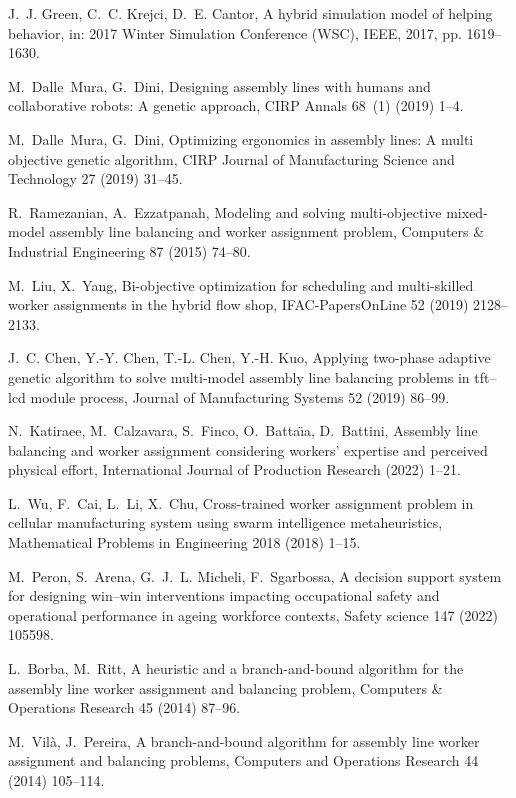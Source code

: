 \documentclass[review,12pt, 3p, times]{elsarticle}
\begin{document}
\begin{thebibliography}{10}
	J.~J. Green, C.~C. Krejci, D.~E. Cantor, A hybrid simulation model of helping
	behavior, in: 2017 Winter Simulation Conference (WSC), IEEE, 2017, pp.
	1619--1630.
	
	M.~Dalle~Mura, G.~Dini, Designing assembly lines with humans and collaborative
	robots: A genetic approach, CIRP Annals 68~(1) (2019) 1--4.
	
	M.~Dalle~Mura, G.~Dini, Optimizing ergonomics in assembly lines: A multi
	objective genetic algorithm, CIRP Journal of Manufacturing Science and
	Technology 27 (2019) 31--45.
	
	R.~Ramezanian, A.~Ezzatpanah, Modeling and solving multi-objective mixed-model
	assembly line balancing and worker assignment problem, Computers \&
	Industrial Engineering 87 (2015) 74--80.
	
	M.~Liu, X.~Yang, Bi-objective optimization for scheduling and multi-skilled
	worker assignments in the hybrid flow shop, IFAC-PapersOnLine 52 (2019)
	2128--2133.
	
	J.~C. Chen, Y.-Y. Chen, T.-L. Chen, Y.-H. Kuo, Applying two-phase adaptive
	genetic algorithm to solve multi-model assembly line balancing problems in
	tft--lcd module process, Journal of Manufacturing Systems 52 (2019) 86--99.
	
	N.~Katiraee, M.~Calzavara, S.~Finco, O.~Batta{\"\i}a, D.~Battini, Assembly line
	balancing and worker assignment considering workers’ expertise and
	perceived physical effort, International Journal of Production Research
	(2022) 1--21.
	
	L.~Wu, F.~Cai, L.~Li, X.~Chu, Cross-trained worker assignment problem in
	cellular manufacturing system using swarm intelligence metaheuristics,
	Mathematical Problems in Engineering 2018 (2018) 1--15.
	
	M.~Peron, S.~Arena, G.~J.~L. Micheli, F.~Sgarbossa, A decision support system
	for designing win--win interventions impacting occupational safety and
	operational performance in ageing workforce contexts, Safety science 147
	(2022) 105598.
	
	L.~Borba, M.~Ritt, A heuristic and a branch-and-bound algorithm for the
	assembly line worker assignment and balancing problem, Computers \&
	Operations Research 45 (2014) 87--96.
	
	M.~Vilà, J.~Pereira, A branch-and-bound algorithm for assembly line worker
	assignment and balancing problems, Computers and Operations Research 44
	(2014) 105--114.
	

\end{thebibliography}
\end{document}
